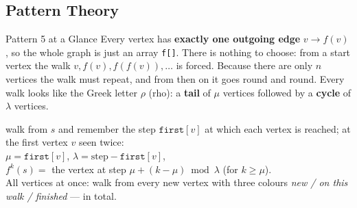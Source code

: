 \subsection{Pattern Theory}
\label{ssec:ch1-p5-theory}

\begin{patternbox}{Pattern 5 at a Glance}
Every vertex has \textbf{exactly one outgoing edge} $v \to f(v)$, so the whole graph is just an array \texttt{f[]}. There is nothing to choose: from a start vertex the walk $v, f(v), f(f(v)), \dots$ is forced. Because there are only $n$ vertices the walk must repeat, and from then on it goes round and round. Every walk looks like the Greek letter $\rho$ (rho): a \textbf{tail} of $\mu$ vertices followed by a \textbf{cycle} of $\lambda$ vertices.

\begin{center}
\end{center}
\begin{recurrencebox}
\centering\small
walk from $s$ and remember the step $\texttt{first}[v]$ at which each vertex is reached; at the first vertex $v$ seen twice:\\[3pt]
$\mu = \texttt{first}[v]$, \qquad $\lambda = \text{step} - \texttt{first}[v]$,\\[2pt]
$f^{k}(s) = $ the vertex at step $\mu + (k-\mu) \bmod \lambda$ \;(for $k \ge \mu$).\\[3pt]
All vertices at once: walk from every new vertex with three colours \emph{new / on this walk / finished} ---  in total.
\end{recurrencebox}
\end{patternbox}

